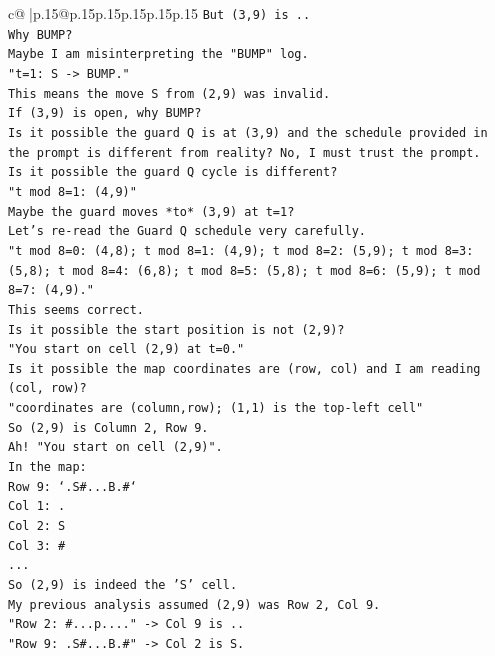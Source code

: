 \documentclass{article}
\begin{document}
{\begin{supertabular}{c@{$\;$}|p{.15\linewidth}@{}p{.15\linewidth}p{.15\linewidth}p{.15\linewidth}p{.15\linewidth}p{.15\linewidth}}
{{{\texttt{But (3,9) is ..} \\
\texttt{Why BUMP?} \\
\texttt{Maybe I am misinterpreting the "BUMP" log.} \\
\texttt{"t=1: S {-}> BUMP."} \\
\texttt{This means the move S from (2,9) was invalid.} \\
\texttt{If (3,9) is open, why BUMP?} \\
\texttt{Is it possible the guard Q is at (3,9) and the schedule provided in the prompt is different from reality? No, I must trust the prompt.} \\
\texttt{Is it possible the guard Q cycle is different?} \\
\texttt{"t mod 8=1: (4,9)"} \\
\texttt{Maybe the guard moves *to* (3,9) at t=1?} \\
\texttt{Let's re{-}read the Guard Q schedule very carefully.} \\
\texttt{"t mod 8=0: (4,8); t mod 8=1: (4,9); t mod 8=2: (5,9); t mod 8=3: (5,8); t mod 8=4: (6,8); t mod 8=5: (5,8); t mod 8=6: (5,9); t mod 8=7: (4,9)."} \\
\texttt{This seems correct.} \\
\texttt{Is it possible the start position is not (2,9)?} \\
\texttt{"You start on cell (2,9) at t=0."} \\
\texttt{Is it possible the map coordinates are (row, col) and I am reading (col, row)?} \\
\texttt{"coordinates are (column,row); (1,1) is the top{-}left cell"} \\
\texttt{So (2,9) is Column 2, Row 9.} \\
\texttt{Ah! "You start on cell (2,9)".} \\
\texttt{In the map:} \\
\texttt{Row 9: `.S\#...B.\#`} \\
\texttt{Col 1: .} \\
\texttt{Col 2: S} \\
\texttt{Col 3: \#} \\
\texttt{...} \\
\texttt{So (2,9) is indeed the 'S' cell.} \\
\texttt{My previous analysis assumed (2,9) was Row 2, Col 9.} \\
\texttt{"Row 2: \#...p...." {-}> Col 9 is ..} \\
\texttt{"Row 9: .S\#...B.\#" {-}> Col 2 is S.} \\
}}}
\end{supertabular}}
\end{document}
